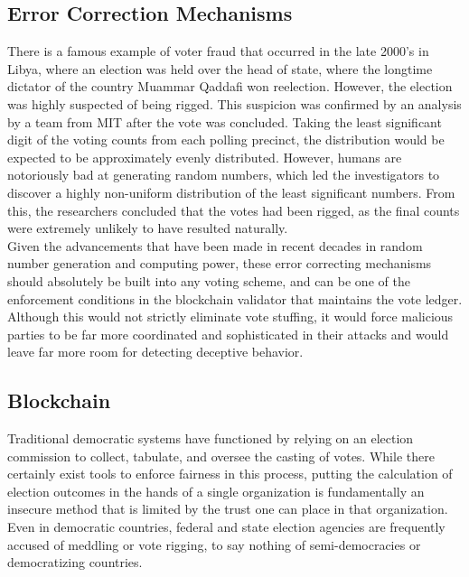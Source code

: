 \documentclass[a4paper]{article}
\begin{document}
\subsection{Error Correction Mechanisms}
There is a famous example of voter fraud that occurred in the late 2000's in Libya, where an election was held over the head of state, where the longtime dictator of the country Muammar Qaddafi won reelection. However, the election was highly suspected of being rigged. This suspicion was confirmed by an analysis by a team from MIT after the vote was concluded. Taking the least significant digit of the voting counts from each polling precinct, the distribution would be expected to be approximately evenly distributed. However, humans are notoriously bad at generating random numbers, which led the investigators to discover a highly non-uniform distribution of the least significant numbers. From this, the researchers concluded that the votes had been rigged, as the final counts were extremely unlikely to have resulted naturally. \\
Given the advancements that have been made in recent decades in random number generation and computing power, these error correcting mechanisms should absolutely be built into any voting scheme, and can be one of the enforcement conditions in the blockchain validator that maintains the vote ledger. Although this would not strictly eliminate vote stuffing, it would force malicious parties to be far more coordinated and sophisticated in their attacks and would leave far more room for detecting deceptive behavior.

\subsection{Blockchain}
Traditional democratic systems have functioned by relying on an election commission to collect, tabulate, and oversee the casting of votes. While there certainly exist tools to enforce fairness in this process, putting the calculation of election outcomes in the hands of a single organization is fundamentally an insecure method that is limited by the trust one can place in that organization. Even in democratic countries, federal and state election agencies are frequently accused of meddling or vote rigging, to say nothing of semi-democracies or democratizing countries. \\
\end{document}
